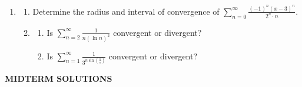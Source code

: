 \documentclass[a4paper, 12pt]{article}
\renewcommand{\headrulewidth}{0pt}
\renewcommand{\headrulewidth}{0pt}
\begin{document}
\begin{enumerate}[leftmargin=*,label=\textbf{\arabic*.}]
\begin{enumerate}[leftmargin=*,label=\textbf{\alph*.}]
\item \begin{enumerate}[leftmargin=*,label=\textbf{\roman*.}]
\item The region $R$ is bounded by $y=x^3+x,\: y=2,$ and $x=0$. Find the volume of the object if $R$ is rotated around the $x$-axis.
\item The region $R$ is bounded by $y=x^3+x,\: y=2,$ and $x=0$. Find the volume of the object if $R$ is rotated around the $y$-axis.
\end{enumerate}
\end{enumerate}

\item \begin{enumerate}[leftmargin=*,label=\textbf{\alph*.}]
\item Determine the radius and interval of convergence of $\displaystyle\sum_{n=0}^\infty\frac{(-1)^n(x-3)^n}{2^n\cdot n}$.
\item \begin{enumerate}[leftmargin=*,label=\textbf{\roman*.}]
\item Is $\displaystyle\sum_{n=2}^\infty\frac1{n(\ln n)^2}$ convergent or divergent?
\item Is $\displaystyle\sum_{n=1}^\infty\frac1{3^{n\sin\left(\frac1n\right)}}$ convergent or divergent?

\end{enumerate}
\end{enumerate}
\end{enumerate}


\newpage
\renewcommand{\headrulewidth}{0pt}
\fancyhead[L]{}
\fancyhead[R]{}

\vspace*{\fill}
\begin{center}
{}
\Huge \textbf{MIDTERM SOLUTIONS}
\end{center}
\vspace*{\fill}

\newpage
\renewcommand{\headrulewidth}{1pt}

{}


\newpage
\pagestyle{fancy}
\renewcommand{\headrulewidth}{1pt}
\end{document}
